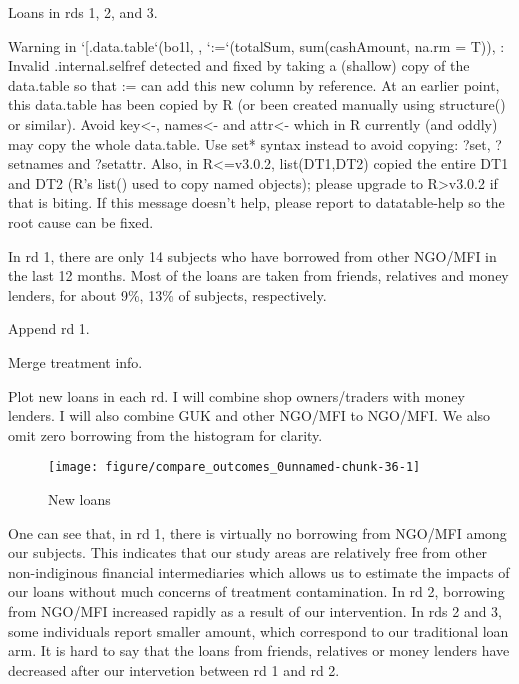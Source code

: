 Loans in rds 1, 2, and 3.
\begin{Schunk}
\begin{Soutput}
Warning in `[.data.table`(bo1l, , `:=`(totalSum, sum(cashAmount, na.rm = T)), : Invalid .internal.selfref detected and fixed by taking a (shallow) copy of the data.table so that := can add this new column by reference. At an earlier point, this data.table has been copied by R (or been created manually using structure() or similar). Avoid key<-, names<- and attr<- which in R currently (and oddly) may copy the whole data.table. Use set* syntax instead to avoid copying: ?set, ?setnames and ?setattr. Also, in R<=v3.0.2, list(DT1,DT2) copied the entire DT1 and DT2 (R's list() used to copy named objects); please upgrade to R>v3.0.2 if that is biting. If this message doesn't help, please report to datatable-help so the root cause can be fixed.
\end{Soutput}
\end{Schunk}
In rd 1, there are only 14 subjects who have borrowed from \textsf{other NGO/MFI} in the last 12 months. Most of the loans are taken from \textsf{friends, relatives} and \textsf{money lenders}, for about 9\%, 13\% of subjects, respectively.



Append rd 1.

Merge treatment info.

Plot new loans in each rd. I will combine \textsf{shop owners/traders} with \textsf{money lenders}. I will also combine \textsf{GUK} and \textsf{other NGO/MFI} to \textsf{NGO/MFI}. We also omit zero borrowing from the histogram for clarity.
\begin{Schunk}
\begin{figure}

{\centering \texttt{[image: figure/compare\_outcomes\_0unnamed-chunk-36-1]} 

}

\caption[New loans]{New loans}\label{Figureunnamed-chunk-36}
\end{figure}
\end{Schunk}
One can see that, in rd 1, there is virtually no borrowing from NGO/MFI among our subjects. This indicates that our study areas are relatively free from other non-indiginous financial intermediaries which allows us to estimate the impacts of our loans without much concerns of treatment contamination. In rd 2, borrowing from NGO/MFI increased rapidly as a result of our intervention. In rds 2 and 3, some individuals report smaller amount, which correspond to our traditional loan arm. It is hard to say that the loans from \textsf{friends, relatives} or \textsf{money lenders} have decreased after our intervetion between rd 1 and rd 2.


